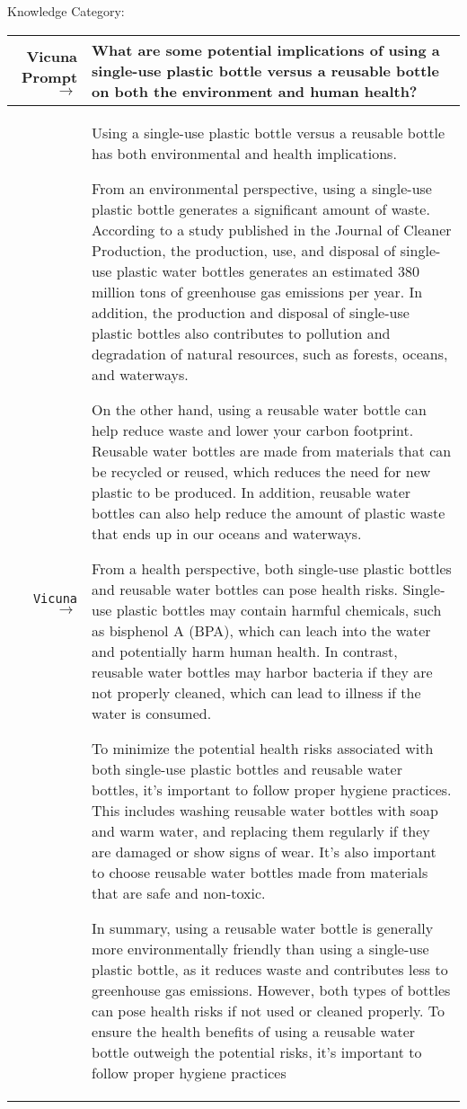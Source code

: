 \documentclass{article}
\begin{document}
{Knowledge Category:

{  \footnotesize \begin{tabularx}{\linewidth}{r X} \toprule Vicuna Prompt $\to$ & {\bf What are some potential implications of using a single-use plastic bottle versus a reusable bottle on both the environment and human health?}
\\
\midrule \texttt{Vicuna} $\to$ &
Using a single-use plastic bottle versus a reusable bottle has both environmental and health implications.

From an environmental perspective, using a single-use plastic bottle generates a significant amount of waste. According to a study published in the Journal of Cleaner Production, the production, use, and disposal of single-use plastic water bottles generates an estimated 380 million tons of greenhouse gas emissions per year. In addition, the production and disposal of single-use plastic bottles also contributes to pollution and degradation of natural resources, such as forests, oceans, and waterways.

On the other hand, using a reusable water bottle can help reduce waste and lower your carbon footprint. Reusable water bottles are made from materials that can be recycled or reused, which reduces the need for new plastic to be produced. In addition, reusable water bottles can also help reduce the amount of plastic waste that ends up in our oceans and waterways.

From a health perspective, both single-use plastic bottles and reusable water bottles can pose health risks. Single-use plastic bottles may contain harmful chemicals, such as bisphenol A (BPA), which can leach into the water and potentially harm human health. In contrast, reusable water bottles may harbor bacteria if they are not properly cleaned, which can lead to illness if the water is consumed.

To minimize the potential health risks associated with both single-use plastic bottles and reusable water bottles, it's important to follow proper hygiene practices. This includes washing reusable water bottles with soap and warm water, and replacing them regularly if they are damaged or show signs of wear. It's also important to choose reusable water bottles made from materials that are safe and non-toxic.

In summary, using a reusable water bottle is generally more environmentally friendly than using a single-use plastic bottle, as it reduces waste and contributes less to greenhouse gas emissions. However, both types of bottles can pose health risks if not used or cleaned properly. To ensure the health benefits of using a reusable water bottle outweigh the potential risks, it's important to follow proper hygiene practices 


\end{tabularx}}}
\end{document}
